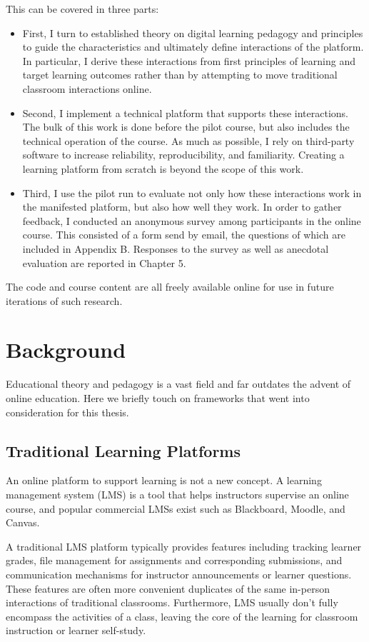 \documentclass[12pt,twoside,vi]{mitthesis}
\begin{document}
This can be covered in three parts:
\begin{itemize}
	\item First, I turn to established theory on digital learning pedagogy and principles to guide the characteristics and ultimately define interactions of the platform. In particular, I derive these interactions from first principles of learning and target learning outcomes rather than by attempting to move traditional classroom interactions online.
	\item Second, I implement a technical platform that supports these interactions. The bulk of this work is done before the pilot course, but also includes the technical operation of the course. As much as possible, I rely on third-party software to increase reliability, reproducibility, and familiarity. Creating a learning platform from scratch is beyond the scope of this work.
	\item Third, I use the pilot run to evaluate not only how these interactions work in the manifested platform, but also how well they work. In order to gather feedback, I conducted an anonymous survey among participants in the online course. This consisted of a form send by email, the questions of which are included in Appendix B. Responses to the survey as well as anecdotal evaluation are reported in Chapter 5.
\end{itemize}

The code and course content are all freely available online for use in future iterations of such research.~\cite{rla}

\chapter{Background}

Educational theory and pedagogy is a vast field and far outdates the advent of online education. Here we briefly touch on frameworks that went into consideration for this thesis. 

\section{Traditional Learning Platforms}

An online platform to support learning is not a new concept. A learning management system (LMS) is a tool that helps instructors supervise an online course, and popular commercial LMSs exist such as Blackboard, Moodle, and Canvas. 

A traditional LMS platform typically provides features including tracking learner grades, file management for assignments and corresponding submissions, and communication mechanisms for instructor announcements or learner questions. These features are often more convenient duplicates of the same in-person interactions of traditional classrooms. Furthermore, LMS usually don’t fully encompass the activities of a class, leaving the core of the learning for classroom instruction or learner self-study. 
\end{document}
